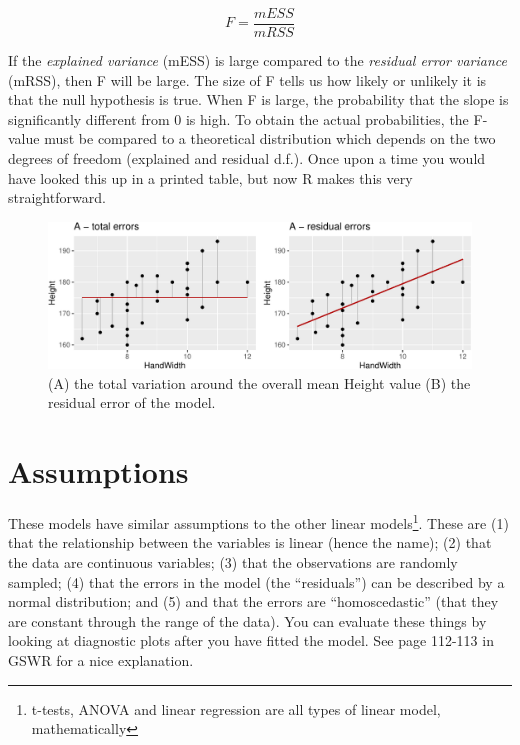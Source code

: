 \documentclass[
  a4paperpaper,
]{book}
\begin{document}
\[F = \frac{mESS}{mRSS}\]

If the \emph{explained variance} (mESS) is large compared to the \emph{residual error variance} (mRSS), then F will be large. The size of F tells us how likely or unlikely it is that the null hypothesis is true. When F is large, the probability that the slope is significantly different from 0 is high. To obtain the actual probabilities, the F-value must be compared to a theoretical distribution which depends on the two degrees of freedom (explained and residual d.f.). Once upon a time you would have looked this up in a printed table, but now R makes this very straightforward.

\begin{figure}[ht]

{\centering \includegraphics{BB852_files/figure-latex/slopeHypo-1} 

}

\caption{(A) the total variation around the overall mean Height value (B) the residual error of the model.}\label{fig:slopeHypo}
\end{figure}

\hypertarget{assumptions}{%
\section{Assumptions}\label{assumptions}}

These models have similar assumptions to the other linear models\footnote{t-tests, ANOVA and linear regression are all types of linear model, mathematically}. These are (1) that the relationship between the variables is linear (hence the name); (2) that the data are continuous variables; (3) that the observations are randomly sampled; (4) that the errors in the model (the ``residuals'') can be described by a normal distribution; and (5) and that the errors are ``homoscedastic'' (that they are constant through the range of the data). You can evaluate these things by looking at diagnostic plots after you have fitted the model. See page 112-113 in GSWR for a nice explanation.
\end{document}
